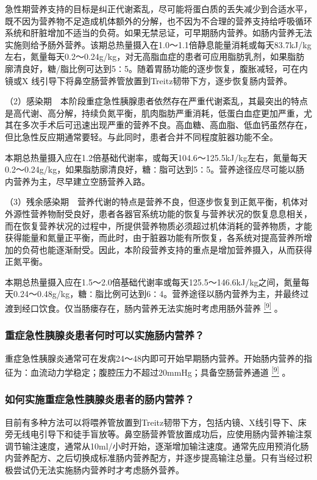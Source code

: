急性期营养支持的目标是纠正代谢紊乱，尽可能将蛋白质的丢失减少到合适水平，既不因为营养物不足造成机体额外的分解，也不因为不合理的营养支持给呼吸循环系统和肝脏增加不适当的负荷。如果无禁忌证，可早期肠内营养。如肠内营养无法实施则给予肠外营养。该期总热量摄入在1.0～1.1倍静息能量消耗或每天83.7kJ/kg左右，氮量每天0.2～0.24g/kg，对无高脂血症的患者可应用脂肪乳剂，如果脂肪廓清良好，糖/脂比例可达到5∶5。随着胃肠功能的逐步恢复，腹胀减轻，可在内镜或X
线引导下将鼻空肠营养管放置到Treitz韧带下方，逐步恢复肠内营养。

（2）感染期　本阶段重症急性胰腺患者依然存在严重代谢紊乱，其最突出的特点是高代谢、高分解，持续负氮平衡，肌肉脂肪严重消耗，低蛋白血症更加严重，尤其在多次手术后可迅速出现严重的营养不良。高血糖、高血脂、低血钙虽然存在，但比急性反应期通常要轻。与此同时，患者合并不同程度脏器功能不全。

本期总热量摄入应在1.2倍基础代谢率，或每天104.6～125.5kJ/kg左右，氮量每天0.2～0.24g/kg，如果脂肪廓清良好，糖∶脂可达到5∶5。营养途径应尽可能以肠内营养为主，尽早建立空肠营养入路。

（3）残余感染期　营养代谢的特点是营养不良，但逐步恢复到正氮平衡，机体对外源性营养物耐受良好，患者各器官系统功能的恢复与营养状况的恢复息息相关，而在恢复营养状况的过程中，所提供营养物质必须超过机体消耗的营养物质，才能获得能量和氮量正平衡，而此时，由于脏器功能有所恢复，各系统对提高营养所增加的负荷也能逐渐耐受。因此，本阶段营养支持的重点是增加营养摄入，从而获得正氮平衡。

本期总热量摄入应在1.5～2.0倍基础代谢率或每天125.5～146.6kJ/kg之间，氮量每天0.24～0.48g/kg，糖∶脂比例可达到6∶4。营养途径以肠内营养为主，并最终过渡到经口饮食。仅当肠瘘存在，肠内营养无法实施时考虑用肠外营养
\protect\hyperlink{text00021.htmlux5cux23ch9-20}{\textsuperscript{{[}9{]}}}
。

\subsubsection{重症急性胰腺炎患者何时可以实施肠内营养？}

重症急性胰腺炎通常可在发病24～48内即可开始早期肠内营养。开始肠内营养的指征为：血流动力学稳定；腹腔压力不超过20mmHg；具备空肠营养通道
\protect\hyperlink{text00021.htmlux5cux23ch9-20}{\textsuperscript{{[}9{]}}}
。

\subsubsection{如何实施重症急性胰腺炎患者的肠内营养？}

目前有多种方法可以将喂养管放置到Treitz韧带下方，包括内镜、X线引导下、床旁无线电引导下和徒手盲放等。鼻空肠营养管放置成功后，应使用肠内营养输注泵调节输注速度，通常从10ml/小时开始，逐渐增加输注速度。通常先应用预消化肠内营养配方、之后切换成标准肠内营养配方，并逐步提高输注总量。只有当经过积极尝试仍无法实施肠内营养时才考虑肠外营养。

